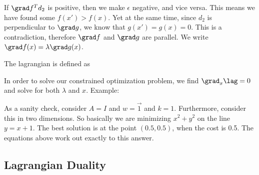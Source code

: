 \documentclass[12pt]{article}
\begin{document}

If $\grad f ^T d_2$ is positive, then we make $\epsilon$ negative, and vice versa. This means we have found some $f(x') > f(x)$. Yet at the same time, since $d_2$ is perpendicular to $\grad g$, we know that $g(x') = g(x) = 0$. This is a contradiction, therefore $\grad f$ and $\grad g$ are parallel. We write $\grad f(x) = \lambda \grad g(x)$.

The lagrangian is defined as


In order to solve our constrained optimization problem, we find $\grad_x \lag = 0$ and solve for both $\lambda$ and $x$. Example:


As a sanity check, consider $A = I$ and $w = \vec 1$ and $k = 1$. Furthermore, consider this in two dimensions. So basically we are minimizing $x^2 + y^2$ on the line $y = x+1$. The best solution is at the point $(0.5, 0.5)$, when the cost is 0.5. The equations above work out exactly to this answer.

\subsection{Lagrangian Duality}
\end{document}

